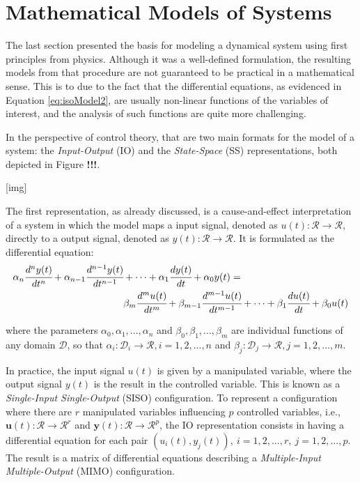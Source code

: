 \documentclass[a4paper,11pt]{book}
\numberwithin{figure}{chapter}
\numberwithin{equation}{chapter}
\numberwithin{table}{chapter}
\theoremstyle{definition}
\begin{document}
\section{Mathematical Models of Systems}

The last section presented the basis for modeling a dynamical system using first principles from physics. Although it was a well-defined formulation, the resulting models from that procedure are not guaranteed to be practical in a mathematical sense. This is to due to the fact that the differential equations, as evidenced in Equation \eqref{eq:isoModel2}, are usually non-linear functions of the variables of interest, and the analysis of such functions are quite more challenging. 

In the perspective of control theory, that are two main formats for the model of a system: the \textit{Input-Output} (IO) and the \textit{State-Space} (SS) representations, both depicted in Figure \textbf{!!!}. 

[img]

The first representation, as already discussed, is a cause-and-effect interpretation of a system in which the model maps a input signal, denoted as $u(t) : \mathcal{R} \rightarrow \mathcal{R}$, directly to a output signal, denoted as $y(t) : \mathcal{R} \rightarrow \mathcal{R}$. It is formulated as the differential equation:
\begin{equation} \label{eq:IORepr01}
\begin{split}
    \alpha_n \cfrac{d^n y(t)}{dt^n} + \alpha_{n-1} \cfrac{d^{n-1} y(t)}{dt^{n-1}} &+ \cdots + \alpha_{1} \cfrac{d y(t)}{dt} + \alpha_{0} y(t) = \\
    & \beta_m \cfrac{d^m u(t)}{dt^m} + \beta_{m-1} \cfrac{d^{m-1} u(t)}{dt^{m-1}} + \cdots + \beta_{1} \cfrac{d u(t)}{dt} + \beta_{0} u(t)
\end{split}
\end{equation}

\noindent where the parameters $\alpha_0, \alpha_1, ..., \alpha_n$ and $\beta_0, \beta_1, ..., \beta_m$ are individual functions of any domain $\mathcal{D}$, so that $\alpha_i : \mathcal{D}_i \rightarrow \mathcal{R}, i = 1,2,...,n$ and $\beta_j : \mathcal{D}_j \rightarrow \mathcal{R}, j = 1,2,...,m$. 

In practice, the input signal $u(t)$ is given by a manipulated variable, where the output signal $y(t)$ is the result in the controlled variable. This is known as a \textit{Single-Input Single-Output} (SISO) configuration. To represent a configuration where there are $r$ manipulated variables influencing $p$ controlled variables, i.e., $\mathbf{u}(t) : \mathcal{R} \rightarrow \mathcal{R}^r$ and $\mathbf{y}(t) : \mathcal{R} \rightarrow \mathcal{R}^p$, the IO representation consists in having a differential equation for each pair $(u_i(t), y_j(t)),\ i = 1,2,...,r,\ j = 1,2,...,p$. The result is a matrix of differential equations describing a \textit{Multiple-Input Multiple-Output} (MIMO) configuration.
\end{document}
